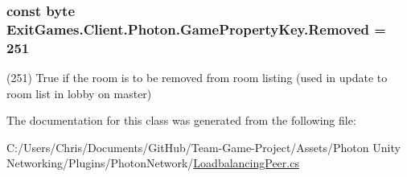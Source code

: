 \subsubsection[{\texorpdfstring{Removed}{Removed}}]{\setlength{\rightskip}{0pt plus 5cm}const byte Exit\+Games.\+Client.\+Photon.\+Game\+Property\+Key.\+Removed = 251}\hypertarget{class_exit_games_1_1_client_1_1_photon_1_1_game_property_key_a18ac3b26c2e0f3efbe3bd03afbae74f6}{}\label{class_exit_games_1_1_client_1_1_photon_1_1_game_property_key_a18ac3b26c2e0f3efbe3bd03afbae74f6}


(251) True if the room is to be removed from room listing (used in update to room list in lobby on master)



The documentation for this class was generated from the following file\+:\begin{DoxyCompactItemize}
\item 
C\+:/\+Users/\+Chris/\+Documents/\+Git\+Hub/\+Team-\/\+Game-\/\+Project/\+Assets/\+Photon Unity Networking/\+Plugins/\+Photon\+Network/\hyperlink{_loadbalancing_peer_8cs}{Loadbalancing\+Peer.\+cs}\end{DoxyCompactItemize}
